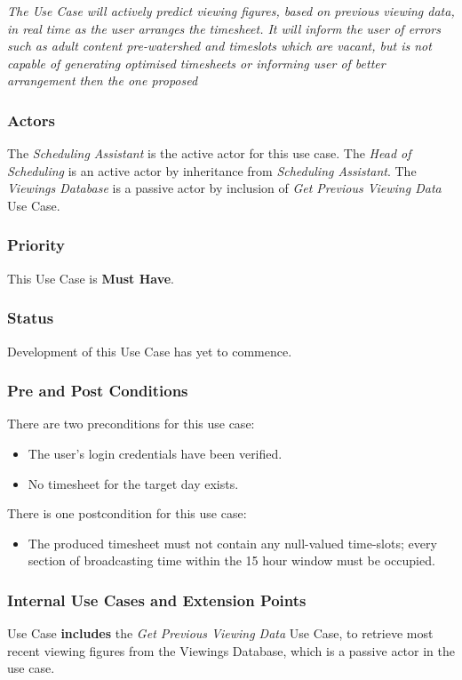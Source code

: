\documentclass[11pt, oneside]{article}
\begin{document}
\textit{The Use Case will actively predict viewing figures, based on previous viewing data, in real time as the user arranges the timesheet. It will inform the user of errors such as adult content pre-watershed and timeslots which are vacant, but is not capable of generating optimised timesheets or informing user of better arrangement then the one proposed}
\subsubsection*{Actors}
The \textit{Scheduling Assistant} is the active actor for this use case.
The \textit{Head of Scheduling} is an active actor by inheritance from \textit{Scheduling Assistant}.
The \textit{Viewings Database} is a passive actor by inclusion of \textit{Get Previous Viewing Data} Use Case.
\subsubsection*{Priority}
This Use Case is \textbf{Must Have}.
\subsubsection*{Status}
Development of this Use Case has yet to commence.
\subsubsection*{Pre and Post Conditions}
There are two preconditions for this use case:
\begin{itemize}
\item The user's login credentials have been verified.
\item No timesheet for the target day exists. 
\end{itemize}
There is one postcondition for this use case: 
\begin{itemize}
 \item The produced timesheet must not contain any null-valued time-slots; every section of broadcasting time within the 15 hour window must be occupied.
 \end{itemize}
 \subsubsection*{Internal Use Cases and Extension Points}
Use Case \textbf{includes} the \textit{Get Previous Viewing Data} Use Case, to retrieve most recent viewing figures from the Viewings Database, which is a passive actor in the use case.
\end{document}
